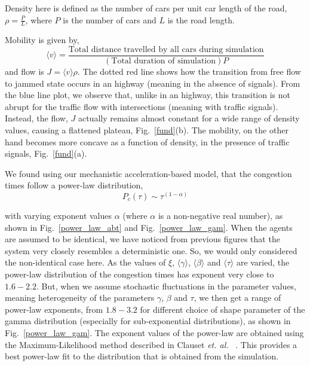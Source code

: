 \documentclass[conference]{IEEEtran}
\begin{document}
Density here is defined as the number of cars per unit car length of the road, $\rho=\frac{P}{L}$, where $P$ is the number of cars and $L$ is the road length.

Mobility is given by,
\[\langle v \rangle = \frac{\text{Total distance travelled by all cars during simulation}}{(\text{Total duration of simulation})P}\]
and flow is $J=\langle v \rangle \rho$. The dotted red line shows how
the transition from free flow to jammed state occurs in an highway
(meaning in the absence of signals). From the blue line plot, we
observe that, unlike in an highway, this transition is not abrupt for the traffic flow with intersections (meaning with traffic signals). Instead, the flow, $J$ actually remains almost constant for a wide range of density values, causing a flattened plateau, Fig.~\ref{fund}(b). The mobility, on the other hand becomes more concave as a function of density, in the presence of traffic signals, Fig.~\ref{fund}(a).



We found using our mechanistic acceleration-based model, that the congestion times follow a power-law distribution, 
\begin{equation}
    P_c(\tau) \sim\tau^{(1-\alpha)}
\end{equation}

with varying exponent values $\alpha$ (where $\alpha$ is a
non-negative real number), as shown in Fig.~\ref{power_law_abt} and
Fig.~\ref{power_law_gam}. When the agents are assumed to be identical,
we have noticed from previous figures that the system very closely
resembles a deterministic one. So, we would only considered the
non-identical case here. As the values of $\xi$, $\langle \gamma
\rangle$, $\langle \beta\rangle$ and $\langle\tau \rangle$ are varied,
the power-law distribution of the congestion times has exponent very close to $1.6-2.2$. But, when we assume stochastic fluctuations in the
parameter values, meaning heterogeneity of the parameters $\gamma$,
$\beta$ and $\tau$, we then get a range of power-law exponents, from
$1.8-3.2$ for different choice of shape parameter of the gamma
distribution (especially for sub-exponential distributions), as shown
in Fig.~\ref{power_law_gam}. The exponent values of the power-law are obtained using the
Maximum-Likelihood method described in Clauset {\em et. al.} ~\cite{Clauset2009}. This provides a best power-law fit to the distribution that is obtained from the simulation.
\end{document}
